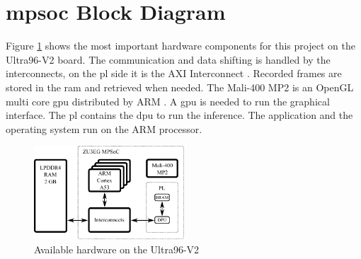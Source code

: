 \section{\acrshort{mpsoc} Block Diagram}
\label{sec:embedded_platform:block_diagram}

Figure \ref{fig:hardware_overview} shows the most important hardware components for this project on the Ultra96-V2 board.
The communication and data shifting is handled by the interconnects, on the \acrlong{pl} side it is the AXI Interconnect \cite{mpsoc_memory}.
Recorded frames are stored in the \acrshort{ram} and retrieved when needed.
The Mali-400 MP2 is an OpenGL multi core \acrfull{gpu} distributed by ARM \cite{arm_mali}.
A \acrshort{gpu} is needed to run the graphical interface.
The \acrshort{pl} contains the \acrshort{dpu} to run the inference.
The application and the operating system run on the ARM processor.

\begin{figure}[h]
	\centering
	\includegraphics[width=0.5\textwidth]{graphics/hardware_overview.pdf}
	\caption{Available hardware on the Ultra96-V2}
	\label{fig:hardware_overview}
\end{figure}
